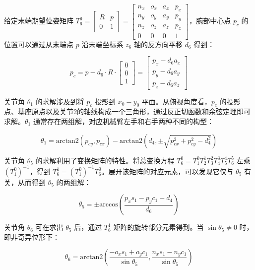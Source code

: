 给定末端期望位姿矩阵 $T_6^0 = \begin{bmatrix} R & p \\ 0 & 1 \end{bmatrix} = \begin{bmatrix} n_x & o_x & a_x & p_x \\ n_y & o_y & a_y & p_y \\ n_z & o_z & a_z & p_z \\ 0 & 0 & 0 & 1 \end{bmatrix}$，腕部中心点 $p_c$ 的位置可以通过从末端点 $p$ 沿末端坐标系 $z_6$ 轴的反方向平移 $d_6$ 得到：

\begin{equation}
  p_c = p - d_6 \cdot R \cdot \begin{bmatrix} 0 \\ 0 \\ 1 \end{bmatrix} = \begin{bmatrix} p_x - d_6 a_x \\ p_y - d_6 a_y \\ p_z - d_6 a_z \end{bmatrix}
\end{equation}

关节角 $\theta_1$ 的求解涉及到将 $p_c$ 投影到 $x_0-y_0$ 平面。从俯视角度看，$p_c$ 的投影点、基座原点以及关节2的轴线构成一个三角形，通过反正切函数和余弦定理即可求解。$\theta_1$ 通常存在两组解，对应机械臂左手和右手两种不同的构型：

\begin{equation}
  \theta_1 = \text{arctan2}(p_{cy}, p_{cx}) - \text{arctan2}(d_4, \pm\sqrt{p_{cx}^2 + p_{cy}^2 - d_4^2})
\end{equation}

关节角 $\theta_5$ 的求解利用了变换矩阵的特性。将总变换方程 $T_6^0 = T_1^0 T_2^1 T_3^2 T_4^3 T_5^4 T_6^5$ 左乘 $(T_1^0)^{-1}$，得到 $T_6^1 = (T_1^0)^{-1} T_6^0$。展开该矩阵的对应元素，可以发现它仅与 $\theta_5$ 有关，从而得到 $\theta_5$ 的两组解：

\begin{equation}
  \theta_5 = \pm \text{arccos}\left(\frac{p_x s_1 - p_y c_1 - d_4}{d_6}\right)
\end{equation}

关节角 $\theta_6$ 可在求出 $\theta_5$ 后，通过 $T_6^1$ 矩阵的旋转部分元素得到。当 $\sin\theta_5 \neq 0$ 时，即非奇异位形下：

\begin{equation}
  \theta_6 = \text{arctan2}\left(\frac{-o_x s_1 + o_y c_1}{\sin\theta_5}, \frac{n_x s_1 - n_y c_1}{\sin\theta_5}\right)
\end{equation}


